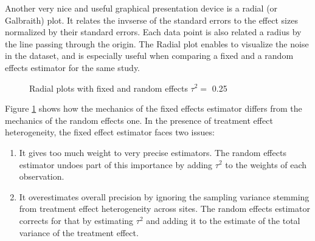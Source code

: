 \documentclass[
]{book}
\newenvironment{Shaded}{\begin{snugshade}}{\end{snugshade}}
\newcommand{\AttributeTok}[1]{\textcolor[rgb]{0.77,0.63,0.00}{#1}}
\newcommand{\FloatTok}[1]{\textcolor[rgb]{0.00,0.00,0.81}{#1}}
\newcommand{\FunctionTok}[1]{\textcolor[rgb]{0.00,0.00,0.00}{#1}}
\newcommand{\NormalTok}[1]{#1}
\newcommand{\OtherTok}[1]{\textcolor[rgb]{0.56,0.35,0.01}{#1}}
\newcommand{\SpecialCharTok}[1]{\textcolor[rgb]{0.00,0.00,0.00}{#1}}
\newcommand{\StringTok}[1]{\textcolor[rgb]{0.31,0.60,0.02}{#1}}
\providecommand{\tightlist}{%
  \setlength{\itemsep}{0pt}\setlength{\parskip}{0pt}}
\theoremstyle{definition}
\theoremstyle{definition}
\theoremstyle{definition}
\theoremstyle{definition}
\theoremstyle{remark}
\begin{document}
Another very nice and useful graphical presentation device is a radial (or Galbraith) plot.
It relates the invserse of the standard errors to the effect sizes normalized by their standard errors.
Each data point is also related a radius by the line passing through the origin.
The Radial plot enables to visualize the noise in the dataset, and is especially useful when comparing a fixed and a random effects estimator for the same study.

\begin{Shaded}
\end{Shaded}

\begin{figure}[htbp]

{\centering {}

}

\caption{Radial plots with fixed and random effects $\tau^2=$ 0.25}\label{fig:Radial}
\end{figure}

Figure \ref{fig:Radial} shows how the mechanics of the fixed effects estimator differs from the mechanics of the random effects one.
In the presence of treatment effect heterogeneity, the fixed effect estimator faces two issues:

\begin{enumerate}
\def\labelenumi{\arabic{enumi}.}
\tightlist
\item
  It gives too much weight to very precise estimators.
  The random effects estimator undoes part of this importance by adding \(\tau^2\) to the weights of each observation.
\item
  It overestimates overall precision by ignoring the sampling variance stemming from treatment effect heterogeneity across sites.
  The random effects estimator corrects for that by estimating \(\tau^2\) and adding it to the estimate of the total variance of the treatment effect.
\end{enumerate}
\end{document}
